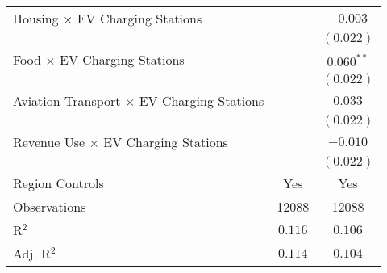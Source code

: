 \begin{center}
\begin{tiny}
\begin{longtable}{l@{} c@{} c@{}}
\quad Housing $\times$ EV Charging Stations            &                  & $-0.003$         \\
                                                       &                  & $(0.022)$        \\
\quad Food $\times$ EV Charging Stations               &                  & $0.060^{**}$     \\
                                                       &                  & $(0.022)$        \\
\quad Aviation Transport $\times$ EV Charging Stations &                  & $0.033$          \\
                                                       &                  & $(0.022)$        \\
\quad Revenue Use $\times$ EV Charging Stations        &                  & $-0.010$         \\
                                                       &                  & $(0.022)$        \\
\hline
Region Controls                                        & Yes              & Yes              \\
Observations                                           & 12088            & 12088            \\
R$^2$                                                  & $0.116$          & $0.106$          \\
Adj. R$^2$                                             & $0.114$          & $0.104$          \\
\end{longtable}
\end{tiny}
\end{center}
